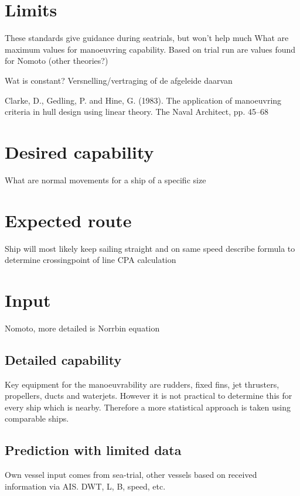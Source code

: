 \section{Limits}
These standards give guidance during seatrials, but won't help much 
What are maximum values for manoeuvring capability. Based on trial run are values found for Nomoto (other theories?)

Wat is constant? Versnelling/vertraging of de afgeleide daarvan

Clarke, D., Gedling, P. and Hine, G. (1983). The application of manoeuvring criteria in hull design using linear theory. The Naval Architect, pp. 45–68

\section{Desired capability}
What are normal movements for a ship of a specific size

\section{Expected route}
Ship will most likely keep sailing straight and on same speed
\todo describe formula to determine crossingpoint of line
\todo CPA calculation

\section{Input}
Nomoto, more detailed is Norrbin equation

\subsection{Detailed capability}
Key equipment for the manoeuvrability are rudders, fixed fins, jet thrusters, propellers, ducts and waterjets. However it is not practical to determine this for every ship which is nearby. Therefore a more statistical approach is taken using comparable ships.






\subsection{Prediction with limited data}
Own vessel input comes from sea-trial, other vessels based on received information via AIS.
DWT, L, B, speed, etc.

